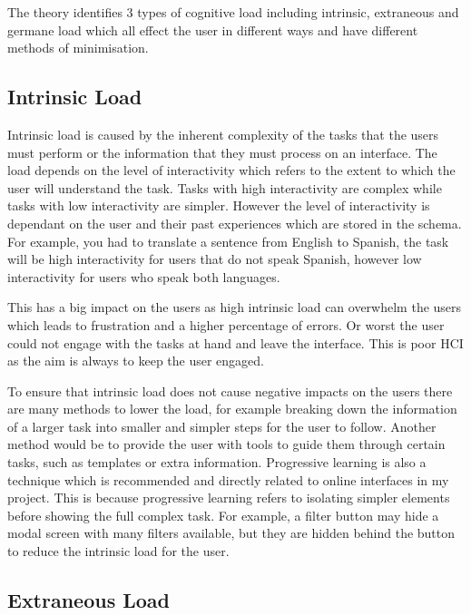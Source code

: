 \documentclass[]{project_interim}
\begin{document}
The theory identifies 3 types of cognitive load including intrinsic, extraneous and germane load which all effect the user in different ways and have different methods of minimisation.\cite{de_jong_cognitive_2010}\cite{schnotz_reconsideration_2007}

\subsection{Intrinsic Load}

Intrinsic load is caused by the inherent complexity of the tasks that the users must perform or the information that they must process on an interface. The load depends on the level of interactivity which refers to the extent to which the user will understand the task. Tasks with high interactivity are complex while tasks with low interactivity are simpler. However the level of interactivity is dependant on the user and their past experiences which are stored in the schema. For example, you had to translate a sentence from English to Spanish, the task will be high interactivity for users that do not speak Spanish, however low interactivity for users who speak both languages.

This has a big impact on the users as high intrinsic load can overwhelm the users which leads to frustration and a higher percentage of errors. Or worst the user could not engage with the tasks at hand and leave the interface. This is poor HCI as the aim is always to keep the user engaged.

To ensure that intrinsic load does not cause negative impacts on the users there are many methods to lower the load, for example breaking down the information of a larger task into smaller and simpler steps for the user to follow. Another method would be to provide the user with tools to guide them through certain tasks, such as templates or extra information. Progressive learning is also a technique which is recommended and directly related to online interfaces in my project. This is because progressive learning refers to isolating simpler elements before showing the full complex task. For example, a filter button may hide a modal screen with many filters available, but they are hidden behind the button to reduce the intrinsic load for the user.\cite{sweller_element_2010}

\subsection{Extraneous Load}
\end{document}
